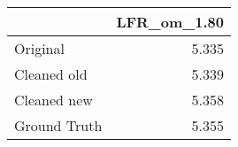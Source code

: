 \begin{tabular}{lr}
\toprule
{} & LFR_om_1.80 \\
\midrule
Original     &       5.335 \\
Cleaned old  &       5.339 \\
Cleaned new  &       5.358 \\
Ground Truth &       5.355 \\
\bottomrule
\end{tabular}
